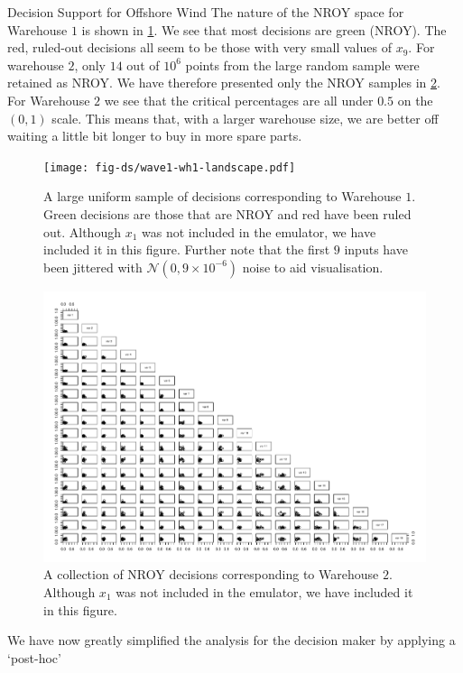 \begin{chapter}{Decision Support for Offshore Wind \label{Ch:ds-for-ow}}
The nature of the NROY space for Warehouse $1$ is shown in \cref{Fig:wave1-w1-nroy}. We see that most decisions are green (NROY). The red, ruled-out decisions all seem to be those with very small values of $x_9$.  For warehouse  $2$, only $14$ out of $10^6$ points from the large random sample were retained as NROY. We have therefore presented only the NROY samples in \cref{Fig:wave1-w2-nroy}. For Warehouse $2$ we see that the critical percentages are all under $0.5$ on the $(0,1)$ scale. This means that, with a larger warehouse size, we are better off waiting a little bit longer to buy in more spare parts.
\begin{figure}
    \centering
    \texttt{[image: fig-ds/wave1-wh1-landscape.pdf]}
    \caption{A large uniform sample of decisions corresponding to Warehouse $1$. Green decisions are those that are NROY and red have been ruled out. Although $x_1$ was not included in the emulator, we have included it in this figure. Further note that the first $9$ inputs have been jittered with $\mathcal{N}(0, 9 \times 10^{-6})$ noise to aid visualisation. \label{Fig:wave1-w1-nroy}}
\end{figure}
\begin{figure}
    \centering
    \includegraphics[width = 8in, angle=90]{fig-ds/wave1-wh2-landscape.pdf}
    \caption{A collection of NROY decisions corresponding to Warehouse $2$. Although $x_1$ was not included in the emulator, we have included it in this figure.\label{Fig:wave1-w2-nroy}}
\end{figure}

We have now greatly simplified the analysis for the decision maker by applying a `post-hoc'


\end{chapter}

